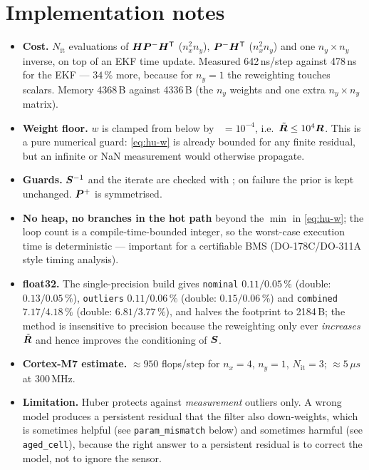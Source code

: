 \section{Implementation notes}
\begin{itemize}[nosep]
\item \textbf{Cost.}  $N_{\mathrm{it}}$ evaluations of $\bm{H}\bm{P}^{-}\bm{H}^{\mathsf{T}}$ ($n_x^2n_y$),
$\bm{P}^{-}\bm{H}^{\mathsf{T}}$ ($n_x^2n_y$) and one $n_y\times n_y$ inverse, on top of an EKF time update.
Measured 642\,ns/step against 478\,ns for the EKF --- $34\,\%$
more, because for $n_y=1$ the reweighting touches scalars.  Memory 4368\,B against
4336\,B (the $n_y$ weights and one extra $n_y\times n_y$ matrix).
\item \textbf{Weight floor.}  $w$ is clamped from below by ~$=10^{-4}$, i.e.\
$\tilde{\bm{R}}\le10^{4}\bm{R}$.  This is a pure numerical guard: \eqref{eq:hu-w} is already bounded for
any finite residual, but an infinite or NaN measurement would otherwise propagate.
\item \textbf{Guards.}  $\bm{S}^{-1}$ and the iterate are checked with ; on failure
the prior is kept unchanged.  $\bm{P}^{+}$ is symmetrised.
\item \textbf{No heap, no branches in the hot path} beyond the $\min$ in \eqref{eq:hu-w}; the loop
count is a compile-time-bounded integer, so the worst-case execution time is deterministic ---
important for a certifiable BMS (DO-178C/DO-311A style timing analysis).
\item \textbf{float32.}  The single-precision build gives \texttt{nominal} $0.11/0.05\,\%$
(double: $0.13/0.05\,\%$), \texttt{outliers} $0.11/0.06\,\%$ (double: $0.15/0.06\,\%$) and
\texttt{combined} $7.17/4.18\,\%$ (double: $6.81/3.77\,\%$), and halves the footprint to
2184\,B; the
method is insensitive to precision because the reweighting only ever \emph{increases} $\tilde{\bm{R}}$
and hence improves the conditioning of $\bm{S}$.
\item \textbf{Cortex-M7 estimate.}  $\approx950$ flops/step for $n_x=4$, $n_y=1$,
$N_{\mathrm{it}}=3$; $\approx5\,\ensuremath{\mu}s$ at 300\,MHz.
\item \textbf{Limitation.}  Huber protects against \emph{measurement} outliers only.  A wrong
model produces a persistent residual that the filter also down-weights, which is sometimes helpful
(see \texttt{param\_mismatch} below) and sometimes harmful (see \texttt{aged\_cell}), because the
right answer to a persistent residual is to correct the model, not to ignore the sensor.
\end{itemize}

